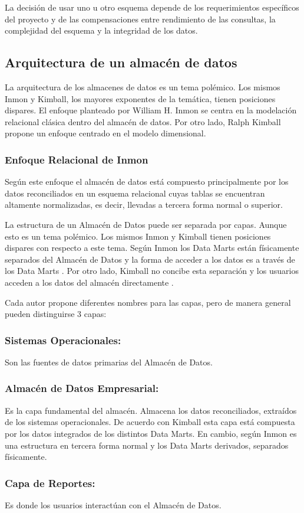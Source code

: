 La decisi\'on de usar uno u otro esquema depende de los requerimientos espec\'ificos del proyecto y de las compensaciones entre 
rendimiento de las consultas, la complejidad del esquema y la integridad de los datos.


\subsection{Arquitectura de un almac\'en de datos}

La arquitectura de los almacenes de datos es un tema pol\'emico. Los mismos Inmon y Kimball, los mayores exponentes de la tem\'atica, 
tienen posiciones dispares. El enfoque planteado por William H. Inmon se centra en la modelación relacional cl\'asica dentro 
del almacén de datos. Por otro lado, Ralph Kimball propone un enfoque centrado en el modelo dimensional.

\subsubsection{Enfoque Relacional de Inmon}

Seg\'un este enfoque el almacén de datos est\'a compuesto principalmente por los datos reconciliados en un esquema 
relacional cuyas tablas se encuentran altamente normalizadas, es decir, llevadas a tercera forma normal o superior\cite{mijailmaster}.


La estructura de un Almac\'en de Datos puede ser separada por capas. Aunque esto es un tema pol\'emico. Los mismos Inmon y Kimball tienen posiciones dispares 
con respecto a este tema. Seg\'un Inmon los Data Marts est\'an f\'isicamente separados del Almac\'en de Datos y la forma de acceder a los datos es 
a trav\'es de los Data Marts \cite{inmon2005building}.
Por otro lado, Kimball no concibe esta separaci\'on y los usuarios acceden a los datos del almac\'en directamente \cite{kimball2011data}.

Cada autor propone diferentes nombres para las capas, pero de manera general pueden distinguirse 3 capas:

\subsubsection{Sistemas Operacionales:}
Son las fuentes de datos primarias del Almac\'en de Datos.

\subsubsection{Almac\'en de Datos Empresarial:} 
Es la capa fundamental del almac\'en. Almacena los datos reconciliados, extra\'idos de los sistemas operacionales. De acuerdo con Kimball esta capa est\'a compuesta
por los datos integrados de los distintos Data Marts. En cambio, seg\'un Inmon es una estructura en tercera forma normal y los Data Marts derivados, separados f\'isicamente. 

\subsubsection{Capa de Reportes:} Es donde los usuarios interact\'uan con el Almac\'en de Datos.

